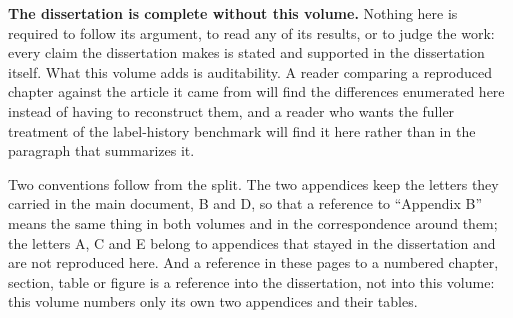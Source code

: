 \documentclass[
    12pt,
    openright,
    oneside,
    a4paper,
    sumario=tradicional,
    brazil,
    english,
]{abntex2}
\begin{document}
\textbf{The dissertation is complete without this volume.} Nothing here is required to
follow its argument, to read any of its results, or to judge the work: every claim the
dissertation makes is stated and supported in the dissertation itself. What this volume adds
is auditability. A reader comparing a reproduced chapter against the article it came from
will find the differences enumerated here instead of having to reconstruct them, and a
reader who wants the fuller treatment of the label-history benchmark will find it here
rather than in the paragraph that summarizes it.

Two conventions follow from the split. The two appendices keep the letters they carried in
the main document, B and D, so that a reference to ``Appendix B'' means the same thing in
both volumes and in the correspondence around them; the letters A, C and E belong to
appendices that stayed in the dissertation and are not reproduced here. And a reference in
these pages to a numbered chapter, section, table or figure is a reference into the
dissertation, not into this volume: this volume numbers only its own two appendices and
their tables.

    \begin{apendicesenv}
        \partapendices
        \setcounter{chapter}{1}
        
        \setcounter{chapter}{3}
        
    \end{apendicesenv}
\end{document}
